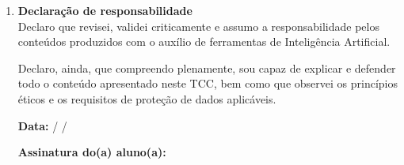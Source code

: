 \begin{enumerate}
\vspace{0.4cm}
\vspace{0.12cm}
\noindent\checkbox\hspace{0.12cm}Cuidados adotados: \formline{10.7cm}

\vspace{0.42cm}
\formline{15.25cm}

\vspace{0.60cm}
Quando o estudo envolver \textbf{coleta, uso ou análise de dados pessoais}, ainda que disponíveis publicamente, as pessoas autoras devem também indicar as medidas adotadas para proteção de dados pessoais, em conformidade com a \textbf{Lei Geral de Proteção de Dados Pessoais} -- LGPD (Lei N$^\circ$ 13.709/2018), descrevendo, quando pertinente, os cuidados adotados no tratamento desses dados, tais como procedimentos de anonimização ou pseudonimização e medidas relacionadas ao armazenamento, acesso e segurança das informações. Imagens de pessoas menores de idade ou vulneráveis devem ser suprimidas ou devidamente anonimizadas no texto.

\vspace{0.38cm}
\vspace{0.12cm}
\noindent\checkbox\hspace{0.12cm}Medidas adotadas: \formline{10.65cm}

\vspace{0.42cm}
\formline{15.25cm}

\vspace*{0.45cm}
\item \textbf{Declaração de responsabilidade}\\

Declaro que revisei, validei criticamente e assumo a responsabilidade pelos conteúdos produzidos com o auxílio de ferramentas de Inteligência Artificial.

\vspace{0.55cm}
Declaro, ainda, que compreendo plenamente, sou capaz de explicar e defender todo o conteúdo apresentado neste TCC, bem como que observei os princípios éticos e os requisitos de proteção de dados aplicáveis.

\vspace{1.0cm}
\textbf{Data:} \formline{0.85cm} / \formline{0.85cm} / \formline{1.5cm}

\vspace{0.55cm}
\textbf{Assinatura do(a) aluno(a):} \formline{7.9cm}
\end{enumerate}

